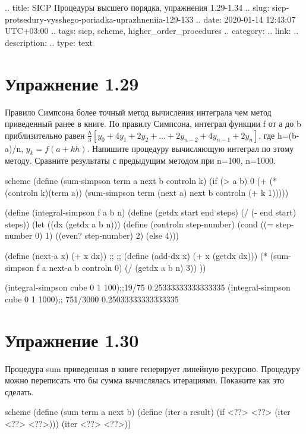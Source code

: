 .. title: SICP Процедуры высшего порядка, упражнения 1.29-1.34
.. slug: sicp-protsedury-vysshego-poriadka-uprazhneniia-129-133
.. date: 2020-01-14 12:43:07 UTC+03:00
.. tags: sicp, scheme, higher_order_procedures
.. category: 
.. link: 
.. description: 
.. type: text


\chapter{Упражнение 1.29}

Правило Симпсона более точный метод вычисления интеграла чем метод приведенный ранее в книге. По правилу Симпсона, интеграл функции f от а до b приблизительно равен $\frac{h}{3}[y_0+4y_1+2y_2+...+2y_{n-2}+4y_{n-1}+2y_n]$, где h=(b-a)/n, $y_k=f(a+kh)$. Напишите процедуру вычисляющую интеграл по этому методу. Сравните результаты с предыдущим методом при n=100, n=1000.

\begin{codelisting}{scheme}
(define (sum-simpson term a next b controln k)
  (if (> a b)
      0
      (+ (* (controln k)(term a))
         (sum-simpson term (next a) next b controln (+ k 1)))))

(define (integral-simpson f a b n)
  (define (getdx start end steps)
    (/ (- end start) steps))
  (let ((dx (getdx a b n)))
    (define (controln step-number)
      (cond ((= step-number 0) 1)
            ((even? step-number) 2)
            (else 4)))

    (define (next-a x)
      (+ x dx))
  ;; ;; (define (add-dx x) (+ x (getdx dx)))
    (* (sum-simpson f a next-a b controln 0)
       (/ (getdx a b n) 3))
    ))

(integral-simpson cube 0 1 100);;19/75 0.25333333333333335
(integral-simpson cube 0 1 1000);; 751/3000 0.25033333333333335
\end{codelisting}

\chapter{Упражнение 1.30}

Процедура sum приведенная в книге генерирует линейную рекурсию. Процедуру можно переписать что бы сумма вычислялась итерациями. Покажите как это сделать.

\begin{codelisting}{scheme}
(define (sum term a next b)
  (define (iter a result)
    (if <??>
        <??>
        (iter <??> <??>)))
  (iter <??> <??>))
\end{codelisting}


